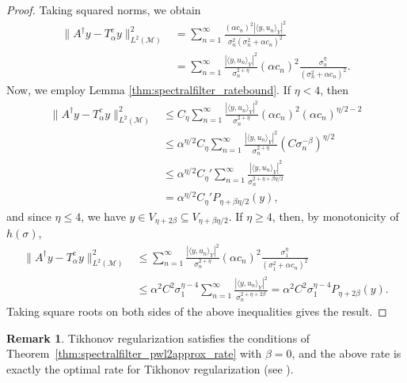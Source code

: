 \documentclass{article}
\theoremstyle{definition}
\newtheorem{remark}[theorem]{Remark}
\newcommand{\smallnorm}[1]{\lVert#1\rVert}
\newcommand{\abs}[1]{\left\lvert#1\right\rvert}
\newcommand{\pseudoinv}[1]{{#1}^\dagger}
\begin{document}
\begin{proof}
Taking squared norms, we obtain 
\begin{align*}
    \smallnorm{\pseudoinv{A} y - T^c_\alpha y}_{L^2(\mathcal{M})}^2
    & = \sum_{n=1}^\infty \frac{(\alpha c_n)^2 \abs{\langle y, u_n\rangle_Y}^2}{\sigma_n^2\left(\sigma_n^2+\alpha c_n\right)^2}
    \\ & =
    \sum_{n=1}^\infty \frac{ \abs{\langle y, u_n\rangle_Y}^2}{\sigma_n^{2+\eta}}(\alpha c_n)^2
    \frac{\sigma_n^\eta}{\left(\sigma_n^2+\alpha c_n\right)^2}.
\end{align*}
Now, we employ Lemma \ref{thm:spectralfilter_ratebound}.
If \(\eta < 4\), then
\begin{align*}
    \smallnorm{\pseudoinv{A} y - T^c_\alpha y}_{L^2(\mathcal{M})}^2
    &\leq
    C_\eta
    \sum_{n=1}^\infty \frac{ \abs{\langle y, u_n\rangle_Y}^2}{\sigma_n^{2+\eta}}
    (\alpha c_n)^2
    (\alpha c_n)^{\eta/2-2}\\
    &\leq
    \alpha^{\eta/2}
    C_\eta
    \sum_{n=1}^\infty \frac{ \abs{\langle y, u_n\rangle_Y}^2}{\sigma_n^{2+\eta}}
    (C\sigma_n^{-\beta})^{\eta/2}\\
    &\leq
    \alpha^{\eta/2}
    C_\eta'
    \sum_{n=1}^\infty \frac{ \abs{\langle y, u_n\rangle_Y}^2}{\sigma_n^{2+\eta+\beta\eta/2}}\\
    &=
    \alpha^{\eta/2}
    C_\eta'
    P_{\eta+\beta\eta/2}(y),
\end{align*}
and since \(\eta\leq 4\), we have \(y\in V_{\eta+2\beta}\subseteq V_{\eta+\beta\eta/2}\).
If \(\eta \geq 4\), then, by monotonicity of $h(\sigma)$, 
\begin{align*}
    \smallnorm{\pseudoinv{A} y - T^c_\alpha y}_{L^2(\mathcal{M})}^2
    &\leq
    \sum_{n=1}^\infty \frac{ \abs{\langle y, u_n\rangle_Y}^2}{\sigma_n^{2+\eta}}
    (\alpha c_n)^2
    \frac{\sigma_1^\eta}{\left(\sigma_1^2+\alpha c_n\right)^2}\\
    &\leq
    \alpha^2
    C^2
    \sigma_1^{\eta-4}
    \sum_{n=1}^\infty \frac{ \abs{\langle y, u_n\rangle_Y}^2}{\sigma_n^{2+\eta+2\beta}}=
    \alpha^2
    C^2
    \sigma_1^{\eta-4}
    P_{\eta+2\beta}(y).
\end{align*}
Taking square roots on both sides of the above inequalities gives the result.
\end{proof}

\begin{remark}
    Tikhonov regularization satisfies the conditions of Theorem~\ref{thm:spectralfilter_pwl2approx_rate} with \(\beta=0\),
    and the above rate is exactly the optimal rate for Tikhonov regularization (see  \cite[Example~4.15]{engl2000regularization}).
\end{remark}
\end{document}
